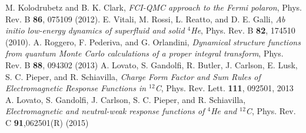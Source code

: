 \begin{thebibliography}{99.}
M. Kolodrubetz and B. K. Clark, \emph{FCI-QMC approach to the Fermi polaron}, Phys. Rev. B {\bf 86}, 075109 (2012).
E. Vitali, M. Rossi, L. Reatto, and D. E. Galli, \emph{Ab initio low-energy dynamics of superfluid and solid $^4$He}, Phys. Rev. B {\bf 82}, 174510 (2010).
A. Roggero, F. Pederiva, and G. Orlandini, \emph{Dynamical structure functions from quantum Monte Carlo calculations of a proper integral transform}, Phys. Rev. B {\bf 88}, 094302 (2013)
A. Lovato, S. Gandolfi, R. Butler, J. Carlson, E. Lusk, S. C. Pieper, and R. Schiavilla, \emph{Charge Form Factor and Sum Rules of Electromagnetic Response Functions in $^{12}$C}, Phys. Rev. Lett. {\bf 111}, 092501, 2013
A. Lovato, S. Gandolfi, J. Carlson, S. C. Pieper, and R. Schiavilla, \emph{Electromagnetic and neutral-weak response functions of $^4$He and $^{12}$C}, Phys. Rev. C {\bf 91},062501(R) (2015)
\end{thebibliography}








